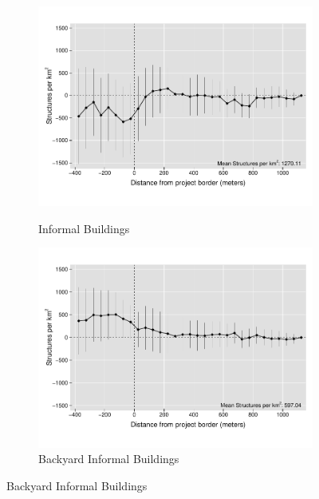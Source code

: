 \documentclass[12pt]{article}
\begin{document}
\begin{figure}[t!]
\begin{subfigure}[b]{0.49\textwidth}
            \label{fig:DDDformal}
        \end{subfigure}
        \vskip 1mm \vskip 0pt
        \begin{subfigure}[b]{0.49\textwidth}
            \centering
            \caption[]{Informal Buildings}
            \vspace{-2mm}
            \includegraphics[width=\textwidth,trim={0cm .8cm 0cm .6cm}, clip=true]{figures/distplotDDD_bblu_inf_admin.pdf}
            \label{fig:DDDinformal}
        \end{subfigure}
        \hfill
        \begin{subfigure}[b]{0.49\textwidth}  
            \centering
            \caption[]{Backyard Informal Buildings}  
            \vspace{-2mm}
            \includegraphics[width=\textwidth,trim={0cm .8cm 0cm .6cm}, clip=true]{figures/distplotDDD_bblu_inf_backyard_admin}

\end{subfigure}
\end{figure}
\end{document}
